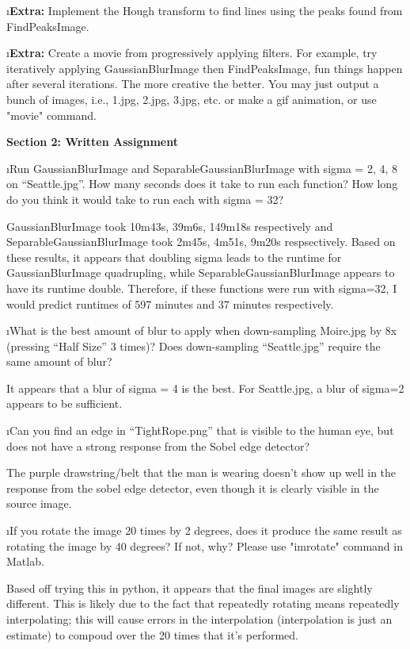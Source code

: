 \documentclass[fleqn]{article}
\begin{document}
\i {\bf Extra:} Implement the Hough transform to find lines using the peaks found from FindPeaksImage.
 
\i {\bf Extra:} Create a movie from progressively applying filters. For example, try iteratively applying GaussianBlurImage then FindPeaksImage, fun things happen after several iterations. The more creative the better. You may just output a bunch of images, i.e., 1.jpg, 2.jpg, 3.jpg, etc. or make a gif animation, or use "movie" command.

\ene

{\bf Section 2: Written Assignment} 

\bee
\i Run GaussianBlurImage and SeparableGaussianBlurImage with sigma = 2, 4, 8 on “Seattle.jpg”. How many seconds does it take to run each function? How long do you think it would take to run each with sigma = 32?

 \begin{solution}
GaussianBlurImage took 10m43s, 39m6s, 149m18s respectively and
SeparableGaussianBlurImage took 2m45s, 4m51s, 9m20s respsectively.
Based on these results, it appears that doubling sigma leads to the runtime for GaussianBlurImage quadrupling, while SeparableGaussianBlurImage appears to have its runtime double.  Therefore, if these functions were run with sigma=32, I would predict runtimes of 597 minutes and 37 minutes respectively.
 \end{solution}

\i What is the best amount of blur to apply when down-sampling Moire.jpg by 8x (pressing “Half Size” 3 times)? Does down-sampling “Seattle.jpg” require the same amount of blur?
 \begin{solution}
     It appears that a blur of sigma = 4 is the best. For Seattle.jpg, a blur of sigma=2 appears to be sufficient.
 \end{solution}

\i Can you find an edge in “TightRope.png” that is visible to the human eye, but does not have a strong response from the Sobel edge detector?
 \begin{solution}
     The purple drawstring/belt that the man is wearing doesn't show up well in the response from the sobel edge detector, even though it is clearly visible in the source image.
 \end{solution}

\i If you rotate the image 20 times by 2 degrees, does it produce the same result as rotating the image by 40 degrees? If not, why? Please use "imrotate" command in Matlab.
 \begin{solution}
     Based off trying this in python, it appears that the final images are slightly different.  This is likely due to the fact that repeatedly rotating means repeatedly interpolating; this will cause errors in the interpolation (interpolation is just an estimate) to compoud over the 20 times that it's performed.
 \end{solution}
\end{document}
